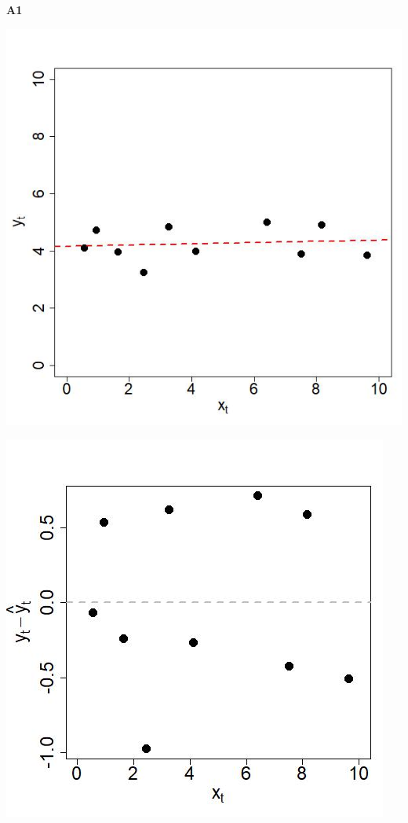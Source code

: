 \documentclass[captions=tableheading, 12pt, headings=small, parskip=half]{scrartcl}
\begin{document}
\begin{enumerate}[label = \alph*)]
{\begin{minipage}{0.05\columnwidth}
\begin{center}
			\Large \textbf{A1}
		\end{center}
		\end{minipage}
		\hfill
		\begin{minipage}{0.46\columnwidth}
			\includegraphics[width= \columnwidth]{Code1/A1.jpeg}
		\end{minipage}
		\hfill
		\begin{minipage}{0.46\columnwidth}
			\includegraphics[width= \columnwidth]{Code1/A1_res.jpeg}
		\end{minipage}
	
}
\end{enumerate}
\end{document}
